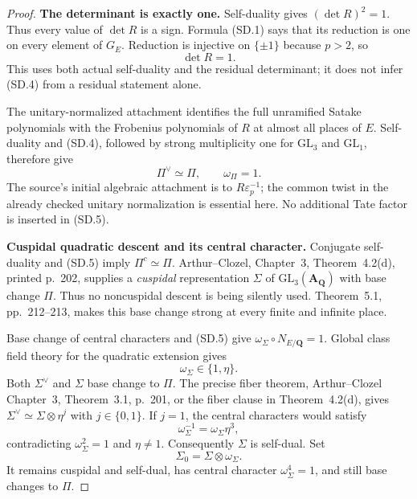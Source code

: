 \documentclass[11pt,a4paper]{article}
\theoremstyle{definition}
\renewcommand{\paragraph}[1]{\par\smallskip\noindent\textbf{#1}\quad\ignorespaces}
\begin{document}
\begin{proof}
\paragraph{The determinant is exactly one.}
Self-duality gives $(\det R)^2=1$.  Thus every value of $\det R$
is a sign.  Formula (SD.1) says that its reduction is one on every
element of $G_E$.  Reduction is injective on $\{\pm1\}$ because
$p>2$, so
\[
                              \det R=1.                  \tag{SD.4}
\]
This uses both actual self-duality and the residual determinant;
it does not infer (SD.4) from a residual statement alone.

The unitary-normalized attachment identifies the full unramified
Satake polynomials with the Frobenius polynomials of $R$ at almost
all places of $E$.  Self-duality and (SD.4), followed by strong
multiplicity one for $\mathrm{GL}_3$ and $\mathrm{GL}_1$, therefore
give
\[
                  \Pi^\vee\simeq\Pi,
                  \qquad\omega_\Pi=1.                   \tag{SD.5}
\]
The source's initial algebraic attachment is to
$R\varepsilon_p^{-1}$; the common twist in the already checked
unitary normalization is essential here.  No additional Tate
factor is inserted in (SD.5).

\paragraph{Cuspidal quadratic descent and its central character.}
Conjugate self-duality and (SD.5) imply
$\Pi^c\simeq\Pi$.  Arthur--Clozel, Chapter~3,
Theorem~4.2(d), printed p.~202, supplies a \emph{cuspidal}
representation $\Sigma$ of $\mathrm{GL}_3(\mathbf A_{\mathbf Q})$
with base change $\Pi$.  Thus no noncuspidal descent is being
silently used.  Theorem~5.1, pp.~212--213, makes this base change
strong at every finite and infinite place.

Base change of central characters and (SD.5) give
$\omega_\Sigma\circ N_{E/\mathbf Q}=1$.
Global class field theory for the quadratic extension gives
\[
                              \omega_\Sigma\in\{1,\eta\}.
                                                               \tag{SD.6}
\]
Both $\Sigma^\vee$ and $\Sigma$ base change to $\Pi$.
The precise fiber theorem, Arthur--Clozel Chapter~3,
Theorem~3.1, p.~201, or the fiber clause in Theorem~4.2(d),
gives $\Sigma^\vee\simeq\Sigma\otimes\eta^j$ with
$j\in\{0,1\}$.  If $j=1$, the central characters would satisfy
\[
                 \omega_\Sigma^{-1}
                          =\omega_\Sigma\eta^3,
\]
contradicting $\omega_\Sigma^2=1$ and $\eta\ne1$.
Consequently $\Sigma$ is self-dual.  Set
\[
                          \Sigma_0=\Sigma\otimes\omega_\Sigma.
                                                               \tag{SD.7}
\]
It remains cuspidal and self-dual, has central character
$\omega_\Sigma^4=1$, and still base changes to $\Pi$.


\end{proof}
\end{document}
